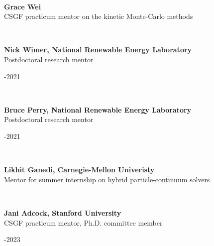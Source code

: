\documentclass[11pt,letterpaper]{article}
\begin{document}
\begin{minipage}[t]{0.15\textwidth}%
\end{minipage}\\[2ex]%
\begin{minipage}[t]{0.82\textwidth}%
  \textbf{Grace Wei}\\%
  CSGF practicum mentor on the kinetic Monte-Carlo methods%
\end{minipage}\hfill%
\begin{minipage}[t]{0.15\textwidth}%
\end{minipage}\\[2ex]%
\begin{minipage}[t]{0.82\textwidth}%
  \textbf{Nick Wimer, National Renewable Energy Laboratory}\\%
  Postdoctoral research mentor%
\end{minipage}\hfill%
\begin{minipage}[t]{0.15\textwidth}-2021%
\end{minipage}\\[2ex]%
\begin{minipage}[t]{0.82\textwidth}%
  \textbf{Bruce Perry, National Renewable Energy Laboratory}\\%
  Postdoctoral research mentor%
\end{minipage}\hfill%
\begin{minipage}[t]{0.15\textwidth}-2021%
\end{minipage}\\[2ex]%
\begin{minipage}[t]{0.82\textwidth}%
  \textbf{Likhit Ganedi, Carnegie-Mellon Univeristy}\\%
  Mentor for summer internship on hybrid particle-continuum solvers%
\end{minipage}\hfill%
\begin{minipage}[t]{0.15\textwidth}%
\end{minipage}\\[2ex]%
\begin{minipage}[t]{0.82\textwidth}%
  \textbf{Jani Adcock, Stanford University}\\%
  CSGF practicum mentor, Ph.D. committee member%
\end{minipage}\hfill%
\begin{minipage}[t]{0.15\textwidth}-2023%
\end{minipage}\\[2ex]%
\end{document}
